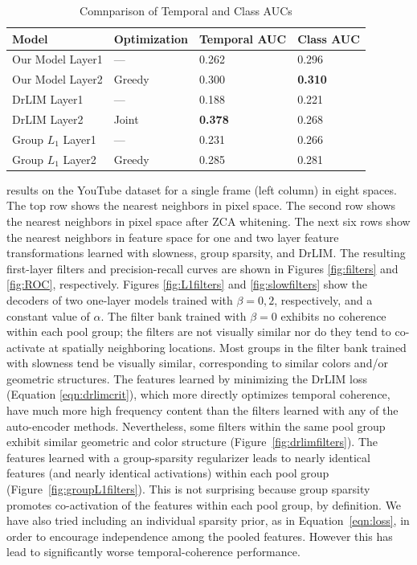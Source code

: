 \begin{table} \centering \begin{tabular}{| l | l | l | l |} \hline Model &
Optimization & Temporal AUC & Class AUC \\ \hline Our Model Layer1 & --- &
0.262 & 0.296 \\ Our Model Layer2 & Greedy & 0.300 & \bf{0.310} \\ DrLIM Layer1
& --- & 0.188 & 0.221 \\ DrLIM Layer2 & Joint & \bf{0.378} & 0.268 \\ Group
$L_1$ Layer1 & --- & 0.231 & 0.266 \\ Group $L_1$ Layer2 & Greedy & 0.285 &
0.281 \\ \hline \end{tabular} \caption{Comnparison of Temporal and Class AUCs} \end{table} %
results on the YouTube dataset for a single frame (left column) in eight
spaces. The top row shows the nearest neighbors in pixel space. The second row
shows the nearest neighbors in pixel space after ZCA whitening. The next six
rows show the nearest neighbors in feature space for one and two layer feature
transformations learned with slowness, group sparsity, and DrLIM. The resulting
first-layer filters and precision-recall curves are shown in Figures
\ref{fig:filters} and \ref{fig:ROC}, respectively.   Figures
\ref{fig:L1filters} and \ref{fig:slowfilters} show the decoders of two
one-layer models trained with $\beta = 0,2$, respectively, and a constant value
of $\alpha$. The filter bank trained with $\beta = 0$ exhibits no coherence
within each pool group; the filters are not visually similar nor do they tend
to co-activate at spatially neighboring locations. Most groups in the filter
bank trained with slowness tend be visually similar, corresponding to similar
colors and/or geometric structures. The features learned by minimizing the
DrLIM loss (Equation \ref{eqn:drlimcrit}), which more directly optimizes
temporal coherence, have much more high frequency content than the filters
learned with any of the auto-encoder methods. Nevertheless, some filters within
the same pool group exhibit similar geometric and color structure
(Figure~\ref{fig:drlimfilters}). The features learned with a group-sparsity
regularizer leads to nearly identical features (and nearly identical
activations) within each pool group (Figure~\ref{fig:groupL1filters}). This is
not surprising because group sparsity promotes co-activation of the features
within each pool group, by definition. We have also tried including an
individual sparsity prior, as in Equation~\ref{eqn:loss}, in order to encourage
independence among the pooled features. However this has lead to significantly
worse temporal-coherence performance.  %

